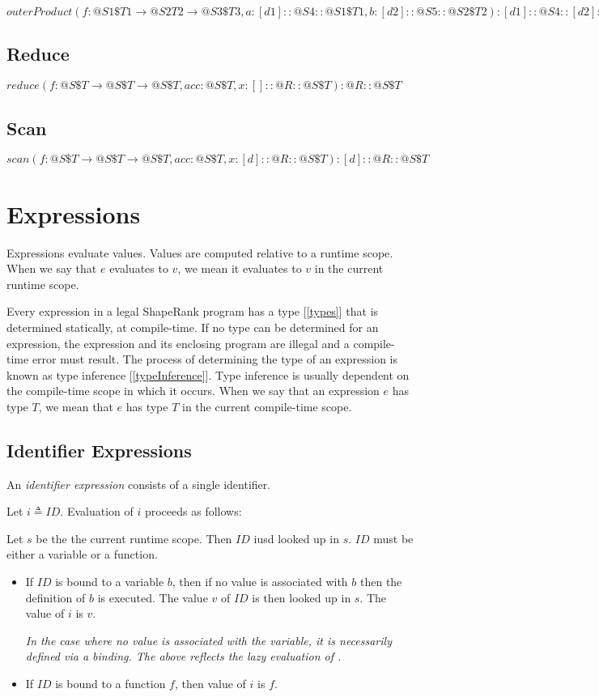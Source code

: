 \documentclass{article}
\begin{document}
$outerProduct(f: @S1 \$T1 \to{} @S2 T2 \to{} @S3 \$T3, a: [d1]::@S4::@S1 \$T1, b: [d2]::@S5::@S2 \$T2): [d1]::@S4::[d2]::@S5::@S3 \$T3$


\subsection{Reduce}
\label{reduce}

$reduce(f: @S \$T \to{} @S \$T \to{} @S \$T, acc: @S \$T, x:[]::@R::@S \$T): @R::@S \$T$

\subsection{Scan}
\label{scan}

$scan(f: @S \$T \to{} @S \$T \to{} @S \$T, acc: @S \$T, x:[d]::@R::@S \$T):[d]::@R::@S \$T$


\section{Expressions}
\label{expressions}

Expressions evaluate values. Values are computed relative to a runtime scope. When we say that $e$ evaluates to $v$, we mean it evaluates to $v$ in the current runtime scope. 

Every expression in a legal ShapeRank program has a type [\ref{types}] that is determined statically, at compile-time. If no type can be determined for an expression, the expression and its enclosing program are illegal and a compile-time error must result. The process of determining the type of an expression is known as type inference [\ref{typeInference}]. Type inference  is usually dependent on the compile-time scope in which it occurs. When we say that an expression $e$ has type $T$, we mean that $e$ has type $T$ in the current compile-time scope.

\subsection{Identifier Expressions}
\label{identifierExpressions}

An {\em identifier expression} consists of a single identifier.

\IdentifierExpression{}

Let $i \triangleq ID$.
Evaluation of $i$ proceeds as follows:


Let $s$ be the the current runtime scope. Then $ID$ iusd looked up in $s$. $ID$ must be either a variable or a function.
\begin{itemize}
\item If $ID$ is bound to a variable $b$, then if no value is associated with $b$ then the definition of $b$ is executed. The value $v$ of $ID$ is then looked up in $s$. The value of $i$ is $v$.

{\em In the case where no value is associated with the variable, it is necessarily defined via  a \LET{} binding. The above reflects the lazy evaluation of \LET{}.}

\item If $ID$ is bound to a function $f$, then value of $i$ is $f$. 
\end{itemize}
\end{document}
